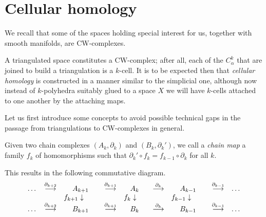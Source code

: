 \section{Cellular homology}
\label{subsec:homcelular}
 We recall that some of the spaces holding special interest for us, together with smooth manifolds, are CW-complexes.

 A triangulated space constitutes a CW-complex; after all, each of the $C^k_{\alpha}$ that are joined to build a triangulation is a $k$-cell. It is to be expected then that \textit{cellular homology} is constructed in a manner similar to the simplicial one, although now instead of $k$-polyhedra suitably glued to a space $X$ we will have $k$-cells attached to one another by the attaching maps.

Let us first introduce some concepts to avoid possible technical gaps in the passage from triangulations to CW-complexes in general.

 \begin{definition}
    Given two chain complexes $(A_k, \partial_k)$ and $(B_k, \partial_k')$, we call a \textit{chain map} a family $f_k$ of homomorphisms such that $\partial_k'\circ f_k = f_{k-1}\circ \partial_k$ for all $k$.
 \end{definition}

 This results in the following commutative diagram.
 \[
 \begin{array}{ccccccccc}
    \dots & \overset{\partial_{k+2}}{\longrightarrow} & A_{k+1} & \overset{\partial_{k+1}}{\longrightarrow} & A_{k} & \overset{\partial_{k}}{\longrightarrow} & A_{k-1} & \overset{\partial_{k-1}}{\longrightarrow} & \dots \\
    & & f_{k+1} \huge\downarrow  ~~~ & & f_k \huge\downarrow ~~ & & f_{k-1} \huge\downarrow ~~~ & & \\
    \dots & \overset{\partial_{k+2}}{\longrightarrow} & B_{k+1} & \overset{\partial_{k+1}}{\longrightarrow} & B_{k} & \overset{\partial_{k}}{\longrightarrow} & B_{k-1} & \overset{\partial_{k-1}}{\longrightarrow} & \dots
 \end{array}
\]

